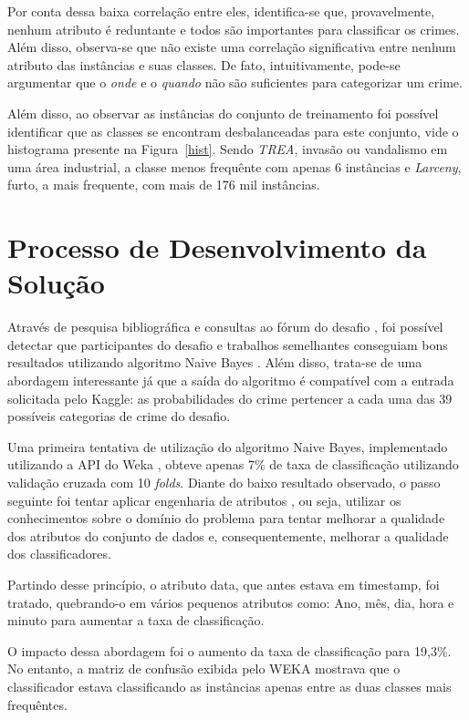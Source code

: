 \documentclass[conference]{IEEEtran}
\begin{document}
Por conta dessa baixa correlação entre eles, identifica-se que, provavelmente, 
nenhum atributo é reduntante e todos são importantes para classificar os crimes. 
Além disso, observa-se que não existe uma correlação significativa entre nenhum 
atributo das instâncias e suas classes. De fato, intuitivamente, pode-se 
argumentar que o \textit{onde} e o \textit{quando} não são suficientes para 
categorizar um crime.

Além disso, ao observar as instâncias do conjunto de treinamento foi possível 
identificar que as classes se encontram desbalanceadas para este conjunto, vide 
o histograma presente na Figura~\ref{hist}. Sendo \textit{TREA}, invasão ou 
vandalismo em uma área industrial, a classe menos frequênte com apenas 6 
instâncias e \textit{Larceny}, furto, a mais frequente, com mais de 176 mil 
instâncias.

\section{Processo de Desenvolvimento da Solução}

Através de pesquisa bibliográfica e consultas ao fórum do desafio 
\cite{kaggleforum}, foi possível detectar que participantes do desafio e 
trabalhos semelhantes conseguiam bons resultados utilizando algoritmo Naive 
Bayes \cite{naivebayes}. Além disso, trata-se de uma abordagem interessante já 
que a saída do algoritmo é compatível com a entrada solicitada pelo Kaggle: as 
probabilidades do crime pertencer a cada uma das 39 possíveis categorias de 
crime do desafio.

Uma primeira tentativa de utilização do algoritmo Naive Bayes, implementado  
utilizando a API do Weka \cite{weka}, obteve apenas 7\% de taxa de 
classificação utilizando validação cruzada com 10 \textit{folds}. Diante do 
baixo resultado observado, o passo seguinte foi tentar aplicar engenharia de 
atributos \cite{featureengi}, ou seja, utilizar os conhecimentos sobre o domínio 
do problema para tentar melhorar a qualidade dos atributos do conjunto de dados 
e, consequentemente, melhorar a qualidade dos classificadores.

Partindo desse princípio, o atributo data, que antes estava em timestamp, foi 
tratado, quebrando-o em vários pequenos atributos como: Ano, mês, dia, hora e 
minuto para aumentar a taxa de classificação.

O impacto dessa abordagem foi o aumento da taxa de classificação para 19,3\%. 
No entanto, a matriz de confusão exibida pelo WEKA mostrava que o classificador 
estava classificando as instâncias apenas entre as duas classes mais frequêntes.
\end{document}
